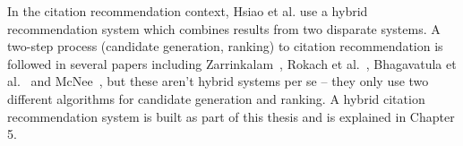 In the citation recommendation context, Hsiao et al.\cite{HsiaoCD15} use a hybrid recommendation system which combines results from two disparate systems.
A two-step process (candidate generation, ranking) to citation recommendation is followed in several papers including Zarrinkalam~\cite{Zarrinkalam2013}, Rokach et al.~\cite{Rokach2013}, Bhagavatula et al.~\cite{Bhagavatula2018} and McNee~\cite{McNeeACGLRKR02}, but these aren't hybrid systems per se -- they only use two different algorithms for candidate generation and ranking.
A hybrid citation recommendation system is built as part of this thesis and is explained in Chapter 5.